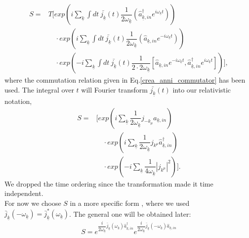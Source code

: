 \documentclass[12pt, titlepage]{article}
\begin{document}
\begin{subappendices}
\begin{equation}
\begin{split}
S=
&T	\Biggl[
    exp
    \left(
       i
    \sum_{\underline{k}}\int dt \ \bar{j_{\underline{k}}}(t)
     	\dfrac{1}{2\omega_{\underline{k}}}
     	\left(
			\hat{a}^{\dagger}_{\underline{k},in} 
			e^{i\omega_{\underline{k}}t}
		\right)    
    \right)   
	\\
&\quad\cdot
 exp
    \left(
       i
    \sum_{\underline{k}}\int dt \ \bar{j_{\underline{k}}}(t)
     	\dfrac{1}{2\omega_{\underline{k}}}
     	\left(
			\hat{a}_{\underline{k},in} 
			e^{-i\omega_{\underline{k}}t}
		\right)    
    \right)
	\\
&\quad\cdot
    exp
    \left(
       -i
    \sum_{\underline{k}}\int dt \ \bar{j_{\underline{k}}}(t)
     	\dfrac{1}{2\cdot2\omega_{\underline{k}}}
     	\left[
			\hat{a}_{\underline{k},in} 
			e^{-i\omega_{\underline{k}}t}     	
     	,
			\hat{a}^{\dagger}_{\underline{k},in} 
			e^{i\omega_{\underline{k}}t}
		\right]    
    \right)	
	\Biggr]
	,
\end{split}
\end{equation}
where the commutation relation given in Eq.\enskip\eqref{crea_anni_commutator} has been used.
The integral over $ t $ will Fourier transform $ \bar{j_{\underline{k}}}(t) $ into our relativistic notation,
\begin{equation}
\begin{split}
S=&	\Biggl[
    exp
    \left(
     	  i
    	\sum_{\underline{k}}
     	\dfrac{1}{2\omega_{\underline{k}}}
     	j_{-k_{\mu}}
			\hat{a}_{\underline{k},in}  		
    \right)
	\\
&\quad\cdot
    exp
    \left(
       i
    \sum_{\underline{k}}
     	\dfrac{1}{2\omega_{\underline{k}}}
     	j_{k^{\mu}}
			\hat{a}^{\dagger}_{\underline{k},in}     
    \right)
	\\
&\quad\cdot
    exp
    \left(
       -i
    \sum_{\underline{k}}
     	\dfrac{1}{4\omega_{\underline{k}}}
    	|j_{k^{\mu}}|^2
    \right)	
	\Biggr]
	.
\end{split}
\end{equation}
We dropped the time ordering since the transformation made it time independent.
\\
For now we choose $ S $ in a more specific form , where we used $ \bar{j}_{\underline{k}}(-\omega_{\underline{k}}) = \bar{j}^{\ast}_{\underline{k}}(\omega_{\underline{k}})  $. The general one will be obtained later:
\begin{equation}
S=e^{\dfrac{i}{2\omega_{\underline{k}}}\bar{j}_{\underline{k}}(\omega_{\underline{k}})\hat{a}^{\dagger}_{\underline{k},in}}
e^{\dfrac{i}{2\omega_{\underline{k}}}\bar{j}_{\underline{k}}(-\omega_{\underline{k}})\hat{a}_{\underline{k},in}}

\end{equation}
\end{subappendices}
\end{document}
